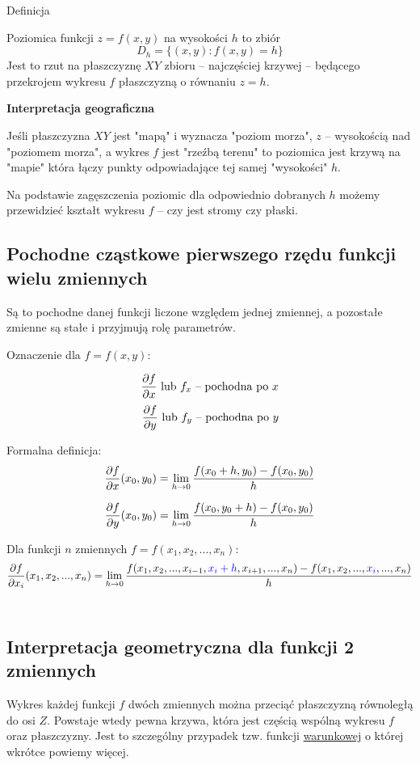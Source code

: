 \begin{tw}{Definicja}

Poziomica funkcji $ z = f(x,y) $ na wysokości $h$ to zbiór
$$ D_h = \{ (x,y): f(x,y) = h \} $$
Jest to rzut na płaszczyznę $XY$ zbioru -- najczęściej krzywej -- będącego przekrojem wykresu $f$ płaszczyzną o równaniu $z = h$.
\end{tw}

\textbf{Interpretacja geograficzna}

Jeśli płaszczyzna $XY$ jest "mapą" i wyznacza "poziom morza", $z$ -- wysokością nad "poziomem morza", a wykres $f$ jest "rzeźbą terenu"
to poziomica jest krzywą na "mapie" która łączy punkty odpowiadające tej samej "wysokości" $h$.

Na podstawie zagęszczenia poziomic dla odpowiednio dobranych $h$ możemy przewidzieć kształt wykresu $f$ -- czy jest stromy czy płaski.


\subsection{Pochodne cząstkowe pierwszego rzędu funkcji wielu zmiennych}

Są to pochodne danej funkcji liczone względem jednej zmiennej, a pozostałe zmienne są stałe i przyjmują rolę parametrów.

Oznaczenie dla $ f = f(x,y) $:

$$ \dpartial{f}{x} \ \textrm{lub} \ f_x \ \textrm{-- pochodna po} \ x $$
$$ \frac{\partial f}{\partial y} \ \textrm{lub} \ f_y \ \textrm{-- pochodna po} \ y $$

Formalna definicja: 
$$ \frac{\partial f}{\partial x} (x_0,y_0) = \lim_{h \to 0} \frac{f(x_0 + h, y_0) - f(x_0, y_0)}{h} $$

$$ \frac{\partial f}{\partial y} (x_0,y_0) = \lim_{h \to 0} \frac{f(x_0, y_0 + h) - f(x_0, y_0)}{h} $$

Dla funkcji $n$ zmiennych $ f = f(x_1, x_2, ..., x_n) $:
$$ \frac{\partial f}{\partial x_i} (x_1, x_2, ..., x_n) = \lim_{h \to 0} \frac{f(x_1, x_2, ..., x_{i - 1}, 
\textcolor{blue}{x_i + h}, x_{i + 1}, ..., x_n) - f(x_1, x_2, ..., \textcolor{blue}{x_i}, ..., x_n)}{h} $$ \\


\subsection{Interpretacja geometryczna dla funkcji 2 zmiennych}

Wykres każdej funkcji $f$ dwóch zmiennych można przeciąć płaszczyzną równoległą do osi $Z$. Powstaje wtedy pewna krzywa, która jest częścią wspólną wykresu $f$
oraz płaszczyzny. Jest to szczególny przypadek tzw. funkcji \underline{warunkowej} o której wkrótce powiemy więcej. \\

